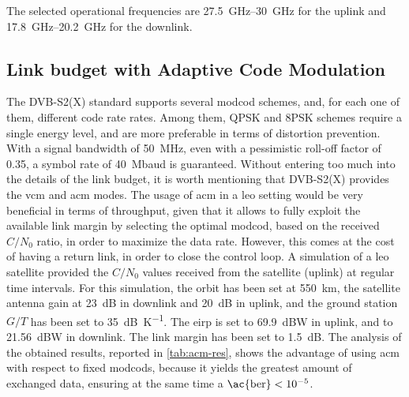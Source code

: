 \documentclass[conference,10pt,a4paper]{IEEEtran}%
\begin{document}
The selected operational frequencies are \SIrange{27.5}{30}{\GHz} for the uplink and  \SIrange{17.8}{20.2}{\GHz} for the downlink.

\subsection{Link budget with Adaptive Code Modulation}
The DVB-S2(X) standard supports several \ac{modcod} schemes, and, for each one of them, different code rate rates.
Among them, QPSK and 8PSK schemes require a single energy level, and are more preferable in terms of distortion prevention.
With a signal bandwidth of \SI{50}{\MHz}, even with a pessimistic roll-off factor of \num{0.35}, a symbol rate of \SI{40}{Mbaud} is guaranteed.
Without entering too much into the details of the link budget, it is worth mentioning that DVB-S2(X) provides the \ac{vcm} and \ac{acm} modes.
The usage of \ac{acm} in a \ac{leo} setting would be very beneficial in terms of throughput, given that it allows to fully exploit the available link margin by selecting the optimal \ac{modcod}, based on the received $C/N_0$ ratio, in order to maximize the data rate.
However, this comes at the cost of having a return link, in order to close the control loop.
A simulation of a \ac{leo} satellite provided the $C/N_0$ values received from the satellite (uplink) at regular time intervals.
For this simulation, the orbit has been set at \SI{550}{\km}, the satellite antenna gain at \SI{23}{dB} in downlink and \SI{20}{dB} in uplink, and the ground station $G/T$ has been set to \SI{35}{dB\per\kelvin}.
The \ac{eirp} is set to \SI{69.9}{dBW} in uplink, and to \SI{21.56}{dBW} in downlink.
The link margin has been set to \SI{1.5}{dB}.
The analysis of the obtained results, reported in \cref{tab:acm-res}, shows the advantage of using \ac{acm} with respect to fixed \glspl{modcod}, because it yields the greatest amount of exchanged data, ensuring at the same time a $\text{\ac{ber}}<10^{-5}$.
\end{document}
